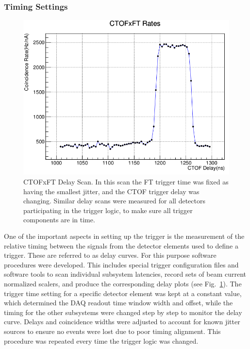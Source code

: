 \subsubsection{Timing Settings}

\begin{figure}[hbt]
	\centering
	\includegraphics[width=1.0\columnwidth,keepaspectratio]{img/delay_scan_ctof_ft.png}
	\caption{CTOFxFT Delay Scan. In this scan the FT trigger time was fixed as having the smallest jitter, and the CTOF trigger delay was changing. Similar delay scans were measured for all detectors participating in the trigger logic, to make sure all trigger components are in time.}
	\label{fig:delay_scan_ctof_ft}
\end{figure}

One of the important aspects in setting up the trigger is the measurement of the relative timing between the signals from the detector elements used to define a trigger. These are referred to as delay curves. For this purpose software procedures were developed. This includes special trigger configuration files and software tools to scan individual subsystem latencies, record sets of beam current normalized scalers, and produce the corresponding delay plots (see Fig.~\ref{fig:delay_scan_ctof_ft}). The trigger time setting for a specific detector element was kept at a constant value, which determined the DAQ readout time window width and offset, while the timing for the other subsystems were changed step by step to monitor the delay curve. Delays and coincidence widths were adjusted to account for known jitter sources to ensure no events were lost due to poor timing alignment. This procedure was repeated every time the trigger logic was changed.


